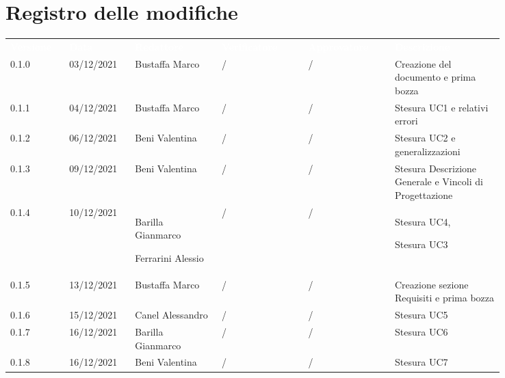 \section*{Registro delle modifiche}

{\renewcommand{\arraystretch}{1.5}
\scriptsize
\begin{tabular}{p{0.10\linewidth}p{0.10\linewidth}p{0.15\linewidth}p{0.15\linewidth}p{0.15\linewidth}p{0.19\linewidth}}
	\rowcolor[RGB]{33, 73, 50}
	\textcolor{white}{\textbf{Versione}} & \textcolor{white}{\textbf{Data}} & 
	\textcolor{white}{\textbf{Redattore}} & \textcolor{white}{\textbf{Verificatore}} & 
	\textcolor{white}{\textbf{Approvatore}} & \textcolor{white}{\textbf{Descrizione}}\\
	\rowcolor[RGB]{216, 235, 171}
	0.1.0 & 03/12/2021 & Bustaffa Marco& / &/& Creazione del documento e prima bozza\\
	\rowcolor[RGB]{233, 245, 206}
	0.1.1 & 04/12/2021 & Bustaffa Marco& / &/& Stesura UC1 e relativi errori\\
	\rowcolor[RGB]{216, 235, 171}
	0.1.2 & 06/12/2021 & Beni Valentina& / &/& Stesura UC2 e generalizzazioni\\
	\rowcolor[RGB]{233, 245, 206}
	0.1.3 & 09/12/2021 & Beni Valentina& / &/& Stesura Descrizione Generale e Vincoli di Progettazione \\
	\rowcolor[RGB]{216, 235, 171}
	0.1.4 & 10/12/2021 & Barilla Gianmarco \par Ferrarini Alessio& / &/& Stesura UC4, \par Stesura UC3 \\
	\rowcolor[RGB]{233, 245, 206}
	0.1.5 & 13/12/2021 & Bustaffa Marco& / &/& Creazione sezione Requisiti e prima bozza\\
	\rowcolor[RGB]{216, 235, 171}
	0.1.6 & 15/12/2021 & Canel Alessandro& /&/& Stesura UC5\\
	\rowcolor[RGB]{233, 245, 206}
	0.1.7 & 16/12/2021 & Barilla Gianmarco& / &/& Stesura UC6\\
	\rowcolor[RGB]{216, 235, 171}
	0.1.8 & 16/12/2021 & Beni Valentina& /&/& Stesura UC7\\
\end{tabular}	
}